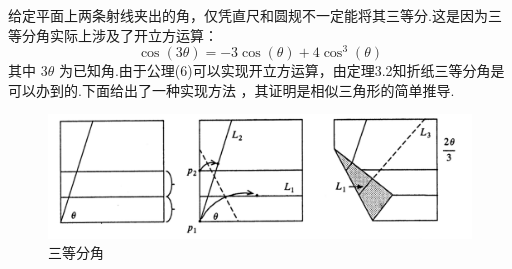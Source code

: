 给定平面上两条射线夹出的角，仅凭直尺和圆规不一定能将其三等分.这是因为三等分角实际上涉及了开立方运算：
$$
\cos(3\theta)=-3\cos(\theta)+4\cos^3(\theta)
$$
其中 $3\theta$ 为已知角.由于公理(6)可以实现开立方运算，由定理3.2知折纸三等分角是可以办到的.下面给出了一种实现方法 \cite{Hul}，其证明是相似三角形的简单推导.

\begin{figure}[h]
    \centering
    \includegraphics[scale=0.4]{trisect.png}
    \caption{三等分角}
\end{figure}